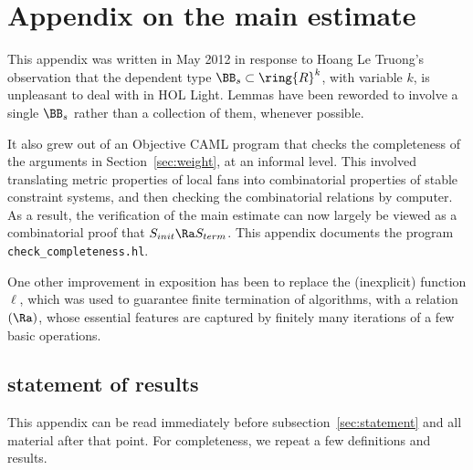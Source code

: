 

\newpage
\section{Appendix on the main estimate}\label{sec:sup-local-fan}

This appendix was written in May 2012 in response to Hoang Le Truong's
observation that the dependent type $\BB_s\subset \ring{R}^k$, with
variable $k$, is unpleasant to deal with in HOL Light.  Lemmas have
been reworded to involve a single $\BB_s$ rather than a collection of
them, whenever possible.

It also grew out of an Objective CAML program that checks the
completeness of the arguments in Section~\ref{sec:weight}, at an
informal level.  This involved translating metric properties of local
fans into combinatorial properties of stable constraint systems,
and then checking the combinatorial relations by computer.  As a
result, the verification of the main estimate can now largely be
viewed as a combinatorial proof that $S_{init}\Ra S_{term}$.  This
appendix documents the program \verb!check_completeness.hl!.

One other improvement in exposition has been to replace the (inexplicit)
function $\ell$, which was used to guarantee finite termination of algorithms,
with a relation $(\Ra)$, whose essential features are captured by
finitely
many iterations of a few basic operations.

\subsection{statement of results}\label{sec:statement'}

This appendix can be read immediately before subsection~\ref{sec:statement}
and all material after that point.
For completeness, we repeat a few definitions and results.



